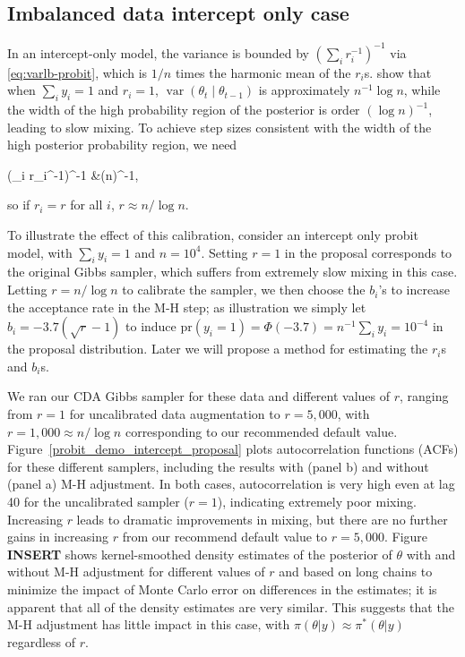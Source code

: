 \documentclass[10pt]{article}
\newcommand{\be}{\begin{equs}}
\newcommand{\ee}{\end{equs}}
\DeclareMathOperator{\var}{var}
\begin{document}
\subsection{Imbalanced data intercept only case}

In an intercept-only model, the variance is bounded by $\left(\sum_i r_i^{-1}\right)^{-1}$ via \eqref{eq:varlb-probit}, which is $1/n$ times the harmonic mean of the $r_i$s. \cite{johndrow2016inefficiency} show that when $\sum_i y_i = 1$ and $r_i = 1$, $\var(\theta_t \mid \theta_{t-1})$ is approximately $n^{-1} \log n$, while the width of the high probability region of the posterior is order $(\log n)^{-1}$, leading to slow mixing. To achieve step sizes consistent with the width of the high posterior probability region, we need
\be
\left(\sum_i r_i^{-1}\right)^{-1} &\approx (\log n)^{-1},
\ee
so if $r_i = r$ for all $i$, $r \approx n/\log n$.

To illustrate the effect of this calibration, consider an intercept only probit model, with $\sum_i y_i =1$ and $n=10^4$. Setting $r=1$ in the proposal corresponds to the original \cite{albert1993bayesian} Gibbs sampler, which suffers from extremely slow mixing in this case.  Letting $r = n/\log n$ to calibrate the sampler, we then choose the $b_i$'s to increase the acceptance rate in the M-H step; as illustration we simply let $b_i = -3.7 (\sqrt r -1)$ to induce $\mbox{pr}(y_i = 1) = \Phi(-3.7) = n^{-1}\sum_i y_i = 10^{-4}$ in the proposal distribution.  Later we will propose a method for estimating the $r_i$s and $b_i$s.  

We ran our CDA Gibbs sampler for these data and different values of $r$, ranging from $r=1$ for uncalibrated data augmentation to $r=5,000$, with $r=1,000 \approx n/\log n$ corresponding to our recommended default value.  Figure~\ref{probit_demo_intercept_proposal} plots autocorrelation functions (ACFs) for these different samplers, including the results with (panel b) and without (panel a) M-H adjustment.  In both cases, autocorrelation is very high even at lag 40 for the uncalibrated sampler ($r=1$), indicating extremely poor mixing.  Increasing $r$ leads to dramatic improvements in mixing, but there are no further gains in increasing $r$ from our recommend default value to $r=5,000$.  
Figure {\bf INSERT} shows kernel-smoothed density estimates of the posterior of $\theta$ with and without M-H adjustment for different values of $r$ and based on long chains to minimize the impact of Monte Carlo error on differences in the estimates; it is apparent that all of the density estimates are very similar.  This suggests that the M-H adjustment has little impact in this case, with $\pi(\theta | y) \approx \pi^*(\theta | y)$ regardless of $r$. 
\end{document}
